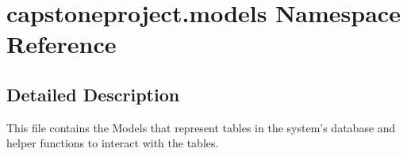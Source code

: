 \hypertarget{namespacecapstoneproject_1_1models}{}\section{capstoneproject.\+models Namespace Reference}
\label{namespacecapstoneproject_1_1models}


\subsection{Detailed Description}
\begin{DoxyVerb}This file contains the Models that represent tables in the system's database
and helper functions to interact with the tables.
\end{DoxyVerb}
 